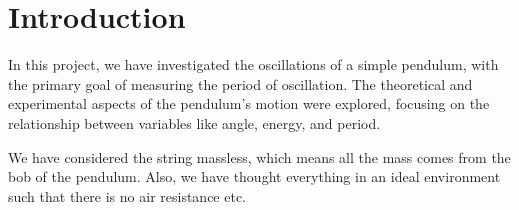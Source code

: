 \chapter{Introduction}

In this project, we have investigated the oscillations of a simple pendulum, with the primary goal of measuring the period of oscillation. The theoretical and experimental aspects of the pendulum's motion were explored, focusing on the relationship between variables like angle, energy, and period.

\bigskip

We have considered the string massless, which means all the mass comes from the bob of the pendulum. Also, we have thought everything in an ideal environment such that there is no air resistance etc.
